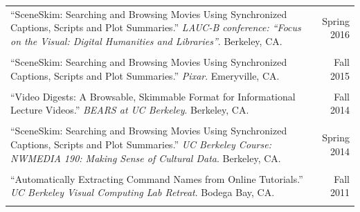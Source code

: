 \begin{longtable}{Xr}
	``SceneSkim: Searching and Browsing Movies Using Synchronized Captions, Scripts and Plot Summaries.'' \textit{LAUC-B conference: ``Focus on the Visual: Digital Humanities and Libraries''}. Berkeley, CA. & Spring 2016 \\
	\\

	``SceneSkim: Searching and Browsing Movies Using Synchronized Captions, Scripts and Plot Summaries.'' \textit{Pixar}. Emeryville, CA. & Fall 2015 \\
	\\

	``Video Digests: A Browsable, Skimmable Format for Informational Lecture Videos.'' \textit{BEARS at UC Berkeley}. Berkeley, CA. & Fall 2014 \\
	\\

	``SceneSkim: Searching and Browsing Movies Using Synchronized Captions, Scripts and Plot Summaries.'' \textit{UC Berkeley Course: NWMEDIA 190: Making Sense of Cultural Data}. Berkeley, CA. & Spring 2014 \\
	\\

	``Automatically Extracting Command Names from Online Tutorials.'' \textit{UC Berkeley Visual Computing Lab Retreat}. Bodega Bay, CA. & Fall 2011 \\
	\\

\end{longtable}
